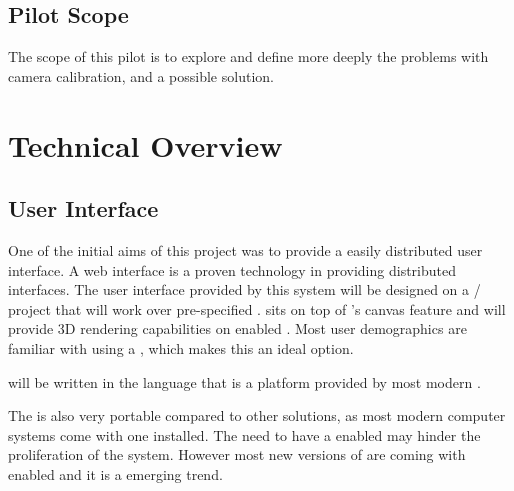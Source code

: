 \documentclass[11pt]{report}
\begin{document}
\subsection{Pilot Scope}
The scope of this pilot is to explore and define more deeply the problems with camera calibration, and a possible solution.  

\section{Technical Overview}

\subsection{User Interface}




One of the initial aims of this project was to provide a easily distributed user interface. A web interface is a proven technology in providing distributed interfaces. The user interface provided by this system will be designed on a / project that will work over pre-specified .  sits on top of 's canvas feature and will provide 3D rendering capabilities on enabled . Most user demographics are familiar with using a , which makes this an ideal option. 

 will be written in the  language that is a platform provided by most modern . 

The  is also very portable compared to other solutions, as most modern computer systems come with one installed. The need to have a  enabled  may hinder the proliferation of the system. However most new versions of  are coming with  enabled and it is a emerging trend.
\end{document}

